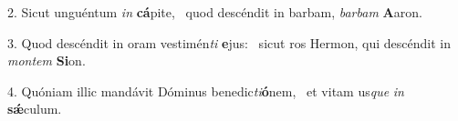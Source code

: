 2. Sicut unguéntum \textit{in} \textbf{cá}pite, \ast\  quod descéndit in barbam, \textit{bar}\textit{bam} \textbf{A}aron.\

3. Quod descéndit in oram vestimén\textit{ti} \textbf{e}jus: \ast\  sicut ros Hermon, qui descéndit in \textit{mon}\textit{tem} \textbf{Si}on.\

4. Quóniam illic mandávit Dóminus benedic\textit{ti}\textbf{ó}nem, \ast\  et vitam us\textit{que} \textit{in} \textbf{sǽ}culum.\

